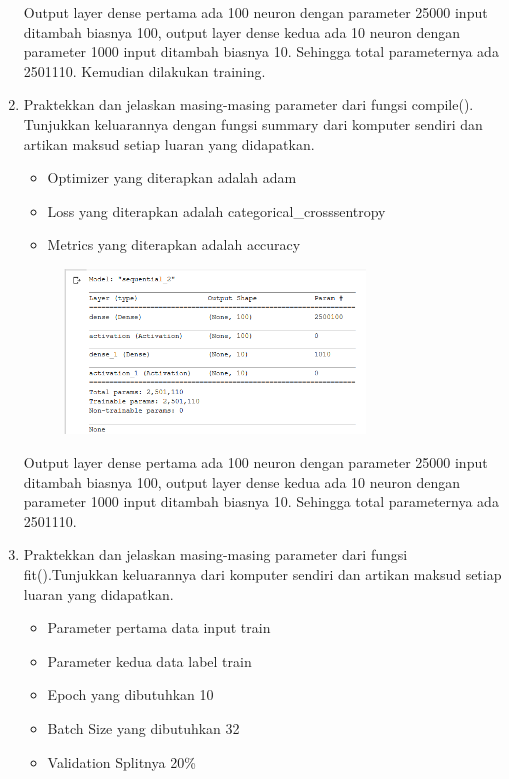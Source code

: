 \begin{enumerate}
\begin{figure}[H]
		\centering
	\end{figure}	
	Output layer dense pertama ada 100 neuron dengan parameter 25000 input ditambah biasnya 100, output layer dense kedua ada 10 neuron dengan parameter 1000 input ditambah biasnya 10. Sehingga total parameternya ada 2501110. Kemudian dilakukan training.
	\item Praktekkan dan jelaskan masing-masing parameter dari fungsi compile(). Tunjukkan keluarannya dengan fungsi summary dari komputer sendiri dan artikan maksud setiap luaran yang didapatkan.
	\hfill\break
	
	\begin{itemize}
		\item Optimizer yang diterapkan adalah adam
		\item Loss yang diterapkan adalah categorical\_crosssentropy
		\item Metrics yang diterapkan adalah accuracy
	\end{itemize}
	\hfill\break
	\begin{figure}[H]
		\includegraphics[width=8cm]{figures/1174006/chapter6/praktek/8-1.png}
		\centering
	\end{figure}
	Output layer dense pertama ada 100 neuron dengan parameter 25000 input ditambah biasnya 100, output layer dense kedua ada 10 neuron dengan parameter 1000 input ditambah biasnya 10. Sehingga total parameternya ada 2501110.
	\item  Praktekkan dan jelaskan masing-masing parameter dari fungsi fit().Tunjukkan keluarannya dari komputer sendiri dan artikan maksud setiap luaran yang didapatkan.
	\hfill\break
	
	\begin{itemize}
		\item Parameter pertama data input train
		\item Parameter kedua data label train
		\item Epoch yang dibutuhkan 10
		\item Batch Size yang dibutuhkan 32
		\item Validation Splitnya 20\%

\end{itemize}
\end{enumerate}
